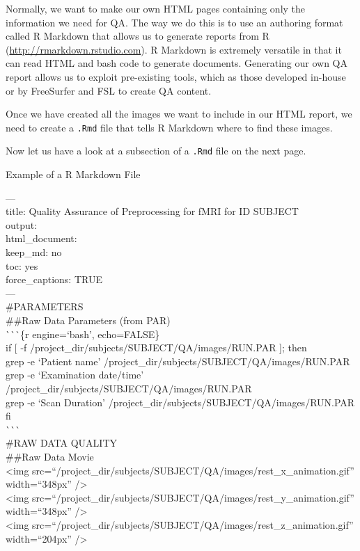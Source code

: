 Normally, we want to make our own HTML pages containing only the information we need for QA. The way we do this is to use an authoring format called R Markdown that allows us to generate reports from R (\url{http://rmarkdown.rstudio.com}). R Markdown is extremely versatile in that it can read HTML and bash code to generate documents. Generating our own QA report allows us to exploit pre-existing tools, which as those developed in-house or by FreeSurfer and FSL to create QA content. 

Once we have created all the images we want to include in our HTML report, we need to create a \texttt{.Rmd} file that tells R Markdown where to find these images. 

Now let us have a look at a subsection of a \texttt{.Rmd} file on the next page.
\clearpage

\begin{bash}{Example of a R Markdown File}{}

--- \\
title: Quality Assurance of Preprocessing for fMRI for ID SUBJECT \\
output: \\
  html_document: \\
    keep_md: no \\
    toc: yes \\
    force_captions: TRUE \\
--- \\

\#PARAMETERS \\

\#\#Raw Data Parameters (from PAR) \\

\`{}\`{}\`{}\{r engine=`bash', echo=FALSE\} \\
if [ -f /project_dir/subjects/SUBJECT/QA/images/RUN.PAR ]; then \\
  grep -e `Patient name' /project_dir/subjects/SUBJECT/QA/images/RUN.PAR \\
  grep -e `Examination date/time' /project_dir/subjects/SUBJECT/QA/images/RUN.PAR \\
  grep -e `Scan Duration' /project_dir/subjects/SUBJECT/QA/images/RUN.PAR \\
fi \\
\`{}\`{}\`{} \\

\#RAW DATA QUALITY \\

\#\#Raw Data Movie \\

<img src=``/project_dir/subjects/SUBJECT/QA/images/rest_x_animation.gif'' width=``348px'' /> \\
<img src=``/project_dir/subjects/SUBJECT/QA/images/rest_y_animation.gif'' width=``348px'' /> \\
<img src=``/project_dir/subjects/SUBJECT/QA/images/rest_z_animation.gif'' width=``204px'' /> \\
\end{bash}

